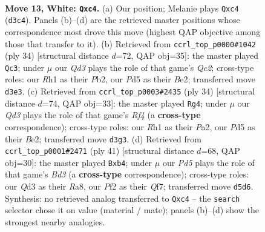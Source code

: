 \documentclass[11pt]{article}
\begin{document}
\clearpage

\begin{figure}[p]\centering
\begin{subfigure}{0.46\textwidth}\centering
\resizebox{\linewidth}{!}{%
\newchessgame
\chessboard[
  setfen={rn2qrk1/p1p1pp1p/5bp1/3P4/2p1P3/B1PQ3P/P4P1P/R3K2R w KQ - 0 13},
  showmover=false,
  pgfstyle=straightmove, color=movearrow, markmove={d3-c4}
]}
\caption{}
\end{subfigure}\hfill
\begin{subfigure}{0.46\textwidth}\centering
\resizebox{\linewidth}{!}{%
\newchessgame
\chessboard[
  setfen={r3r1k1/1pq1pp1p/3p2p1/p2P1b2/P1PR4/7P/1PQ1BPP1/R5K1 w - - 1 18},
  showmover=false,
  pgfstyle=straightmove, color=movearrow, markmove={c2-c3}
]}
\caption{}
\end{subfigure}
\\[4pt]
\begin{subfigure}{0.46\textwidth}\centering
\resizebox{\linewidth}{!}{%
\newchessgame
\chessboard[
  setfen={r1b1r1k1/ppp2pqp/3p4/5Pp1/4PR2/6Q1/PPP1B1PP/R6K w - - 2 18},
  showmover=false,
  pgfstyle=straightmove, color=movearrow, markmove={f4-g4}
]}
\caption{}
\end{subfigure}\hfill
\begin{subfigure}{0.46\textwidth}\centering
\resizebox{\linewidth}{!}{%
\newchessgame
\chessboard[
  setfen={r3k2r/p1p2qpp/1p1b4/1P3p2/QB2p3/P3P3/5PPP/R4RK1 b kq - 5 21},
  showmover=false,
  pgfstyle=straightmove, color=movearrow, markmove={d6-b4}
]}
\caption{}
\end{subfigure}
\caption{\textbf{Move 13, White: \texttt{Qxc4}.} (a) Our position; Melanie plays \texttt{Qxc4} (\texttt{d3c4}). Panels (b)--(d) are the retrieved master positions whose correspondence most drove this move (highest QAP objective among those that transfer to it). (b) Retrieved from \texttt{ccrl\_top\_p0000\#1042} (ply 34) [structural distance $d$=72, QAP obj=35]: the master played \texttt{Qc3}; under $\mu$ our \emph{Qd3} plays the role of that game's \emph{Qc2}; cross-type roles: our \emph{R}h1 as their \emph{P}b2, our \emph{P}d5 as their \emph{B}e2; transferred move \texttt{d3e3}. (c) Retrieved from \texttt{ccrl\_top\_p0003\#2435} (ply 34) [structural distance $d$=74, QAP obj=33]: the master played \texttt{Rg4}; under $\mu$ our \emph{Qd3} plays the role of that game's \emph{Rf4} (a \textbf{cross-type} correspondence); cross-type roles: our \emph{R}h1 as their \emph{P}a2, our \emph{P}d5 as their \emph{B}e2; transferred move \texttt{d3g3}. (d) Retrieved from \texttt{ccrl\_top\_p0001\#2471} (ply 41) [structural distance $d$=68, QAP obj=30]: the master played \texttt{Bxb4}; under $\mu$ our \emph{Pd5} plays the role of that game's \emph{Bd3} (a \textbf{cross-type} correspondence); cross-type roles: our \emph{Q}d3 as their \emph{R}a8, our \emph{P}f2 as their \emph{Q}f7; transferred move \texttt{d5d6}. Synthesis: no retrieved analog transferred to \texttt{Qxc4} -- the \texttt{search} selector chose it on value (material / mate); panels (b)--(d) show the strongest nearby analogies.}
\label{fig:thought-m24}
\end{figure}
\end{document}
